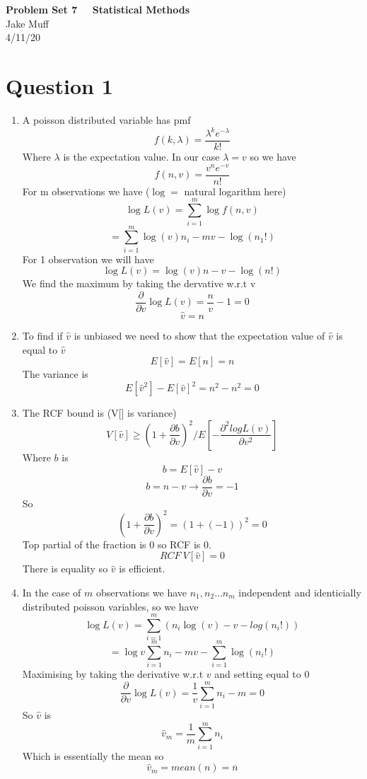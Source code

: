 \documentclass[12pt]{article}
\begin{document}
\normalsize

\baselineskip 14pt

\begin{center}
{\Large {\bf Problem Set 7 \ \ Statistical Methods}} \\
Jake Muff \\
4/11/20
\end{center}

\section{Question 1}

\begin{enumerate}
    \item A poisson distributed variable has pmf 
    $$ f(k, \lambda) = \frac{\lambda^k e^{- \lambda}}{k!} $$
    Where $\lambda$ is the expectation value. In our case $\lambda = v$ so we have 
    $$ f(n,v) = \frac{v^n e^{-v}}{n!} $$
    For m observations we have ($\log =$ natural logarithm here)
    $$ \log L(v) = \sum^m_{i=1} \log f(n,v) $$
    $$ = \sum^m_{i=1} \log(v)n_i - mv - \log(n_1 !) $$
    For 1 observation we will have 
    $$ \log L(v) = \log(v)n - v - \log(n!) $$
    We find the maximum by taking the dervative w.r.t v 
    $$ \frac{\partial}{\partial v} \log L(v) = \frac{n}{v} -1 = 0 $$
    $$ \hat{v} = n $$ 

    \item To find if $\hat{v}$ is unbiased we need to show that the expectation value of $\hat{v}$ is equal to $\hat{v}$
    $$ E[\hat{v}] = E[n] = n $$
    The variance is 
    $$ E[\hat{v}^2] - E[\hat{v}]^2 = n^2 - n^2 = 0 $$
    
    \item The RCF bound is (V[] is variance)
    $$ V[\hat{v}] \geq (1+ \frac{\partial b}{\partial v})^2 / E[- \frac{\partial^2 log L(v)}{\partial v^2}] $$
    Where $b$ is 
    $$ b = E[\hat{v}] - v $$ 
    $$ b = n-v \rightarrow \frac{\partial b}{\partial v} = -1 $$ 
    So 
    $$ (1+ \frac{\partial b}{\partial v})^2 = (1+(-1))^2 = 0 $$
    Top partial of the fraction is 0 so RCF is 0.
    $$ RCF \ V[\hat{v}] = 0 $$
     There is equality so $\hat{v}$ is efficient. 

     \item In the case of $m$ observations we have $n_1, n_2 \ldots n_m$ independent and identicially distributed poisson variables, so we have 
     $$ \log L(v) = \sum^m_{i=1} (n_i \log(v) - v - log(n_i !)) $$
     $$ = \log v \sum^m_{i=1} n_i - mv - \sum^m_{i=1} \log(n_i !) $$
     Maximising by taking the derivative w.r.t $v$ and setting equal to 0
     $$ \frac{\partial}{\partial v} \log L(v) = \frac{1}{v} \sum^m_{i=1} n_i -m =0 $$
     So $\hat{v}$ is 
     $$ \hat{v}_m = \frac{1}{m} \sum^m_{i=1} n_i $$ 
     Which is essentially the mean so 
     $$ \hat{v}_m = mean(n) = \overline{n} $$


\end{enumerate}
\end{document}

